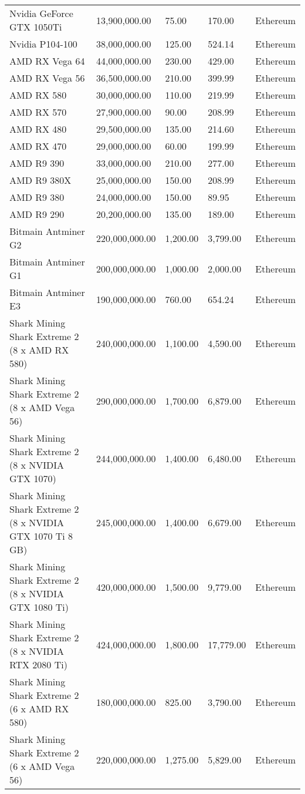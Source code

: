 \begin{longtable}{|p{}|p{}|p{}|p{}|p{}|}
  Nvidia GeForce GTX 1050Ti & 13,900,000.00 & 75.00 & 170.00 & Ethereum \\
  Nvidia P104-100 & 38,000,000.00 & 125.00 & 524.14 & Ethereum \\
  AMD RX Vega 64 & 44,000,000.00 & 230.00 & 429.00 & Ethereum \\
  AMD RX Vega 56 & 36,500,000.00 & 210.00 & 399.99 & Ethereum \\
  AMD RX 580 & 30,000,000.00 & 110.00 & 219.99 & Ethereum \\
  AMD RX 570 & 27,900,000.00 & 90.00 & 208.99 & Ethereum \\
  AMD RX 480 & 29,500,000.00 & 135.00 & 214.60 & Ethereum \\
  AMD RX 470 & 29,000,000.00 & 60.00 & 199.99 & Ethereum \\
  AMD R9 390 & 33,000,000.00 & 210.00 & 277.00 & Ethereum \\
  AMD R9 380X & 25,000,000.00 & 150.00 & 208.99 & Ethereum \\
  AMD R9 380 & 24,000,000.00 & 150.00 & 89.95 & Ethereum \\
  AMD R9 290 & 20,200,000.00 & 135.00 & 189.00 & Ethereum \\
  Bitmain Antminer G2 & 220,000,000.00 & 1,200.00 & 3,799.00 & Ethereum \\
  Bitmain Antminer G1 & 200,000,000.00 & 1,000.00 & 2,000.00 & Ethereum \\
  Bitmain Antminer E3 & 190,000,000.00 & 760.00 & 654.24 & Ethereum \\
  Shark Mining Shark Extreme 2 (8 x AMD RX 580) & 240,000,000.00 & 1,100.00 & 4,590.00 & Ethereum \\
  Shark Mining Shark Extreme 2 (8 x AMD Vega 56) & 290,000,000.00 & 1,700.00 & 6,879.00 & Ethereum \\
  Shark Mining Shark Extreme 2 (8 x NVIDIA GTX 1070) & 244,000,000.00 & 1,400.00 & 6,480.00 & Ethereum \\
  Shark Mining Shark Extreme 2 (8 x NVIDIA GTX 1070 Ti 8 GB) & 245,000,000.00 & 1,400.00 & 6,679.00 & Ethereum \\
  Shark Mining Shark Extreme 2 (8 x NVIDIA GTX 1080 Ti) & 420,000,000.00 & 1,500.00 & 9,779.00 & Ethereum \\
  Shark Mining Shark Extreme 2 (8 x NVIDIA RTX 2080 Ti) & 424,000,000.00 & 1,800.00 & 17,779.00 & Ethereum \\
  Shark Mining Shark Extreme 2 (6 x AMD RX 580) & 180,000,000.00 & 825.00 & 3,790.00 & Ethereum \\
  Shark Mining Shark Extreme 2 (6 x AMD Vega 56) & 220,000,000.00 & 1,275.00 & 5,829.00 & Ethereum \\

\end{longtable}
